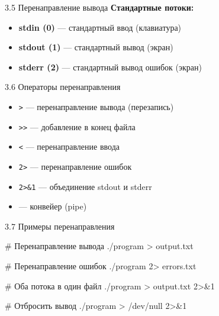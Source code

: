\documentclass[
  ignorenonframetext,
  aspectratio=169,
  russian,
]{beamer}
\newenvironment{Shaded}{\begin{snugshade}}{\end{snugshade}}
\newcommand{\CommentTok}[1]{\textcolor[rgb]{0.37,0.37,0.37}{#1}}
\newcommand{\DecValTok}[1]{\textcolor[rgb]{0.68,0.00,0.00}{#1}}
\newcommand{\ExtensionTok}[1]{\textcolor[rgb]{0.00,0.23,0.31}{#1}}
\newcommand{\NormalTok}[1]{\textcolor[rgb]{0.00,0.23,0.31}{#1}}
\newcommand{\OperatorTok}[1]{\textcolor[rgb]{0.37,0.37,0.37}{#1}}
\providecommand{\tightlist}{%
  \setlength{\itemsep}{0pt}\setlength{\parskip}{0pt}}
\begin{document}
\begin{frame}{3.5 Перенаправление вывода}
\label{ux43fux435ux440ux435ux43dux430ux43fux440ux430ux432ux43bux435ux43dux438ux435-ux432ux44bux432ux43eux434ux430}
\textbf{Стандартные потоки:}

\begin{itemize}[<+->]
\tightlist
\item
  \textbf{stdin (0)} --- стандартный ввод (клавиатура)
\item
  \textbf{stdout (1)} --- стандартный вывод (экран)
\item
  \textbf{stderr (2)} --- стандартный вывод ошибок (экран)
\end{itemize}
\end{frame}

\begin{frame}[fragile]{3.6 Операторы перенаправления}
\label{ux43eux43fux435ux440ux430ux442ux43eux440ux44b-ux43fux435ux440ux435ux43dux430ux43fux440ux430ux432ux43bux435ux43dux438ux44f}
\begin{itemize}[<+->]
\tightlist
\item
  \texttt{\textgreater{}} --- перенаправление вывода (перезапись)
\item
  \texttt{\textgreater{}\textgreater{}} --- добавление в конец файла
\item
  \texttt{\textless{}} --- перенаправление ввода
\item
  \texttt{2\textgreater{}} --- перенаправление ошибок
\item
  \texttt{2\textgreater{}\&1} --- объединение stdout и stderr
\item
  \texttt{\textbar{}} --- конвейер (pipe)
\end{itemize}
\end{frame}

\begin{frame}[fragile]{3.7 Примеры перенаправления}
\label{ux43fux440ux438ux43cux435ux440ux44b-ux43fux435ux440ux435ux43dux430ux43fux440ux430ux432ux43bux435ux43dux438ux44f}
\begin{Shaded}
\begin{Highlighting}[]
\CommentTok{\# Перенаправление вывода}
\ExtensionTok{./program} \OperatorTok{\textgreater{}}\NormalTok{ output.txt}

\CommentTok{\# Перенаправление ошибок}
\ExtensionTok{./program} \DecValTok{2}\OperatorTok{\textgreater{}}\NormalTok{ errors.txt}

\CommentTok{\# Оба потока в один файл}
\ExtensionTok{./program} \OperatorTok{\textgreater{}}\NormalTok{ output.txt }\DecValTok{2}\OperatorTok{\textgreater{}\&}\DecValTok{1}

\CommentTok{\# Отбросить вывод}
\ExtensionTok{./program} \OperatorTok{\textgreater{}}\NormalTok{ /dev/null }\DecValTok{2}\OperatorTok{\textgreater{}\&}\DecValTok{1}
\end{Highlighting}
\end{Shaded}
\end{frame}
\end{document}
